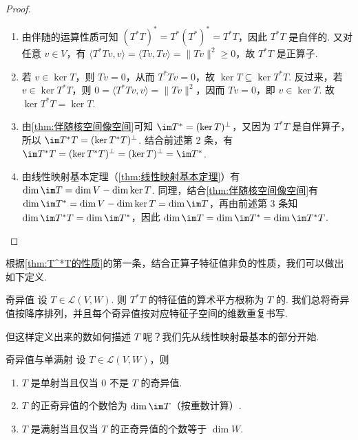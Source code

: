 \begin{proof}
    \begin{enumerate}
        \item 由伴随的运算性质可知 $(T^*T)^* = T^*(T^*)^* = T^*T$，因此 $T^*T$ 是自伴的. 又对任意 $v \in V$，有 $\langle T^*Tv, v \rangle = \langle Tv, Tv \rangle = \lVert Tv \rVert^2 \geqslant 0$，故 $T^*T$ 是正算子.

        \item 若 $v \in \ker T$，则 $Tv = 0$，从而 $T^*Tv = 0$，故 $\ker T \subseteq \ker T^*T$. 反过来，若 $v \in \ker T^*T$，则 $0 = \langle T^*Tv, v \rangle = \lVert Tv \rVert^2$，因而 $Tv = 0$，即 $v \in \ker T$. 故 $\ker T^*T = \ker T$.

        \item 由\autoref{thm:伴随核空间像空间}可知 $\im T^* = (\ker T)^{\perp}$，又因为 $T^*T$ 是自伴算子，所以 $\im T^*T = (\ker T^*T)^{\perp}$. 结合前述第 2 条，有 $\im T^*T = (\ker T^*T)^{\perp} = (\ker T)^{\perp} = \im T^*$.

        \item 由线性映射基本定理（\autoref{thm:线性映射基本定理}）有 $\dim \im T = \dim V - \dim \ker T$. 同理，结合\autoref{thm:伴随核空间像空间}有 $\dim \im T^* = \dim V - \dim \ker T = \dim \im T$，再由前述第 3 条知 $\dim \im T^*T = \dim \im T^*$，因此 $\dim \im T = \dim \im T^* = \dim \im T^*T$.
    \end{enumerate}
\end{proof}

根据\autoref{thm:T^*T的性质}的第一条，结合正算子特征值非负的性质，我们可以做出如下定义.

\begin{definition}{奇异值}{} 
    设 $T \in \mathcal{L}(V, W)$. 则 $T^*T$ 的特征值的算术平方根称为 $T$ 的. 我们总将奇异值按降序排列，并且每个奇异值按对应特征子空间的维数重复书写.
\end{definition}

但这样定义出来的数如何描述 $T$ 呢？我们先从线性映射最基本的部分开始.

\begin{theorem}{}{奇异值与单满射}
    设 $T \in \mathcal{L}(V, W)$，则
    \begin{enumerate}
        \item $T$ 是单射当且仅当 $0$ 不是 $T$ 的奇异值.

        \item $T$ 的正奇异值的个数恰为 $\dim \im T$（按重数计算）.

        \item $T$ 是满射当且仅当 $T$ 的正奇异值的个数等于 $\dim W$.
    \end{enumerate}
\end{theorem}

